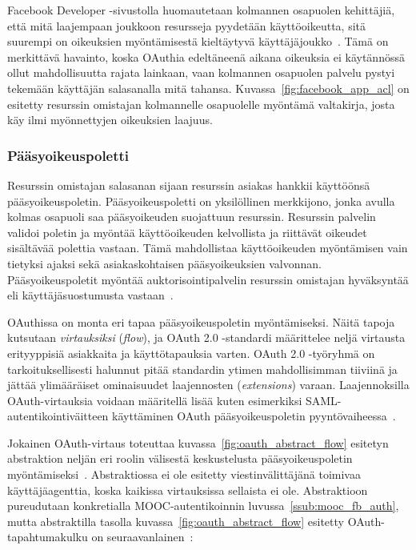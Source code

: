 \documentclass[finnish,gradu]{tktltiki}
\begin{document}
  Facebook Developer -sivustolla huomautetaan kolmannen osapuolen kehittäjiä, että mitä laajempaan joukkoon resursseja pyydetään käyttöoikeutta, sitä suurempi on oikeuksien myöntämisestä kieltäytyvä käyttäjäjoukko~\cite{facebook_oauth2_doc}. Tämä on merkittävä havainto, koska OAuthia edeltäneenä aikana oikeuksia ei käytännössä ollut mahdollisuutta rajata lainkaan, vaan kolmannen osapuolen palvelu pystyi tekemään käyttäjän salasanalla mitä tahansa. Kuvassa~\ref{fig:facebook_app_acl} on esitetty resurssin omistajan kolmannelle osapuolelle myöntämä valtakirja, josta käy ilmi myönnettyjen oikeuksien laajuus.




  \subsubsection{Pääsyoikeuspoletti} %
  \label{ssub:oauth_tokenit}

  Resurssin omistajan salasanan sijaan resurssin asiakas hankkii käyttöönsä pääsyoikeuspoletin. Pääsyoikeuspoletti on yksilöllinen merkkijono, jonka avulla kolmas osapuoli saa pääsyoikeuden suojattuun resurssin. Resurssin palvelin validoi poletin ja myöntää käyttöoikeuden kelvollista ja riittävät oikeudet sisältävää polettia vastaan. Tämä mahdollistaa käyttöoikeuden myöntämisen vain tietyksi ajaksi sekä asiakaskohtaisen pääsyoikeuksien valvonnan. Pääsyoikeuspoletit myöntää auktorisointipalvelin resurssin omistajan hyväksyntää eli käyttäjäsuostumusta vastaan~\cite{ietf_oauth2}.

  OAuthissa on monta eri tapaa pääsyoikeuspoletin myöntämiseksi. Näitä tapoja kutsutaan \emph{virtauksiksi} (\emph{flow}), ja OAuth 2.0 -standardi määrittelee neljä virtausta erityyppisiä asiakkaita ja käyttötapauksia varten. OAuth 2.0 -työryhmä on tarkoituksellisesti halunnut pitää standardin ytimen mahdollisimman tiiviinä ja jättää ylimääräiset ominaisuudet laajennosten (\emph{extensions}) varaan. Laajennoksilla OAuth-virtauksia voidaan määritellä lisää kuten esimerkiksi SAML-autentikointiväitteen käyttäminen OAuth pääsyoikeuspoletin pyyntövaiheessa~\cite{ietf_oauth2_saml_bearer}.

  Jokainen OAuth-virtaus toteuttaa kuvassa~\ref{fig:oauth_abstract_flow} esitetyn abstraktion neljän eri roolin välisestä keskustelusta pääsyoikeuspoletin myöntämiseksi~\cite{ietf_oauth2}. Abstraktiossa ei ole esitetty viestinvälittäjänä toimivaa käyttäjäagenttia, koska kaikissa virtauksissa sellaista ei ole. Abstraktioon pureudutaan konkretialla MOOC-autentikoinnin luvussa~\ref{ssub:mooc_fb_auth}, mutta abstraktilla tasolla kuvassa~\ref{fig:oauth_abstract_flow} esitetty OAuth-tapahtumakulku on seuraavanlainen~\cite{ietf_oauth2}:
\end{document}
